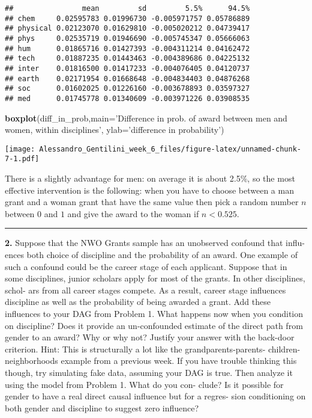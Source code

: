 \documentclass[]{article}
\newenvironment{Shaded}{\begin{snugshade}}{\end{snugshade}}
\newcommand{\KeywordTok}[1]{\textcolor[rgb]{0.13,0.29,0.53}{\textbf{{#1}}}}
\newcommand{\DataTypeTok}[1]{\textcolor[rgb]{0.13,0.29,0.53}{{#1}}}
\newcommand{\StringTok}[1]{\textcolor[rgb]{0.31,0.60,0.02}{{#1}}}
\newcommand{\NormalTok}[1]{{#1}}
\begin{document}
\begin{verbatim}
##                mean         sd         5.5%      94.5%
## chem     0.02595783 0.01996730 -0.005971757 0.05786889
## physical 0.02123070 0.01629810 -0.005020212 0.04739417
## phys     0.02535719 0.01946690 -0.005745347 0.05666063
## hum      0.01865716 0.01427393 -0.004311214 0.04162472
## tech     0.01887235 0.01443463 -0.004389686 0.04225132
## inter    0.01816500 0.01417233 -0.004076405 0.04120737
## earth    0.02171954 0.01668648 -0.004834403 0.04876268
## soc      0.01602025 0.01226160 -0.003678893 0.03597327
## med      0.01745778 0.01340609 -0.003971226 0.03908535
\end{verbatim}

\begin{Shaded}
\begin{Highlighting}[]
\KeywordTok{boxplot}\NormalTok{(diff_in_prob,}\DataTypeTok{main=}\StringTok{'Difference in prob. of award between men and women, within disciplines'}\NormalTok{,}
\DataTypeTok{ylab=}\StringTok{'difference in probability'}\NormalTok{)}
\end{Highlighting}
\end{Shaded}

\texttt{[image: Alessandro\_Gentilini\_week\_6\_files/figure-latex/unnamed-chunk-7-1.pdf]}

There is a slightly advantage for men: on average it is about 2.5\%, so
the most effective intervention is the following: when you have to
choose between a man grant and a woman grant that have the same value
then pick a random number \(n\) between \(0\) and \(1\) and give the
award to the woman if \(n<0.525\).

\begin{center}\rule{0.5\linewidth}{0.5pt}\end{center}

\textbf{2.} Suppose that the NWO Grants sample has an unobserved
confound that influ- ences both choice of discipline and the probability
of an award. One example of such a confound could be the career stage of
each applicant. Suppose that in some disciplines, junior scholars apply
for most of the grants. In other disciplines, schol- ars from all career
stages compete. As a result, career stage influences discipline as well
as the probability of being awarded a grant. Add these influences to
your DAG from Problem 1. What happens now when you condition on
discipline? Does it provide an un-confounded estimate of the direct path
from gender to an award? Why or why not? Justify your answer with the
back-door criterion. Hint: This is structurally a lot like the
grandparents-parents- children-neighborhoods example from a previous
week. If you have trouble thinking this though, try simulating fake
data, assuming your DAG is true. Then analyze it using the model from
Problem 1. What do you con- clude? Is it possible for gender to have a
real direct causal influence but for a regres- sion conditioning on both
gender and discipline to suggest zero influence?
\end{document}
